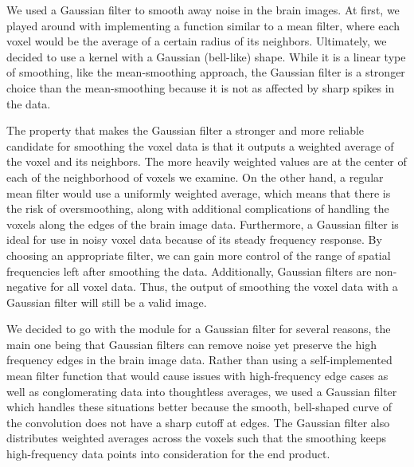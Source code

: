 
\par \indent We used a Gaussian filter to smooth away noise in the brain 
images. At first, we played around with implementing a function similar 
to a mean filter, where each voxel would be the average of a certain radius 
of its neighbors. Ultimately, we decided to use a kernel with a Gaussian 
(bell-like) shape. While it is a linear type of smoothing, like the 
mean-smoothing approach, the Gaussian filter is a stronger choice than the 
mean-smoothing because it is not as affected by sharp spikes in the data. 

\par The property that makes the Gaussian filter a stronger and more 
reliable candidate for smoothing the voxel data is that it outputs a weighted 
average of the voxel and its neighbors. The more heavily weighted values are 
at the center of each of the neighborhood of voxels we examine. On the other 
hand, a regular mean filter would use a uniformly weighted average, which 
means that there is the risk of oversmoothing, along with additional 
complications of handling the voxels along the edges of the brain image data. 
Furthermore, a Gaussian filter is ideal for use in noisy voxel data because of 
its steady frequency response. By choosing an appropriate filter, we can 
gain more control of the range of spatial frequencies left after smoothing 
the data. Additionally, Gaussian filters are non-negative for all voxel data. 
Thus, the output of smoothing the voxel data with a Gaussian filter will still 
be a valid image. 

\par We decided to go with the module for a Gaussian filter for several reasons, 
the main one being that Gaussian filters can remove noise yet preserve the high 
frequency edges in the brain image data. Rather than using a self-implemented mean 
filter function that would cause issues with high-frequency edge cases as well as 
conglomerating data into thoughtless averages, we used a Gaussian filter which 
handles these situations better because the smooth, bell-shaped curve of the 
convolution does not have a sharp cutoff at edges. The Gaussian filter also 
distributes weighted averages across the voxels such that the smoothing keeps 
high-frequency data points into consideration for the end 
product.
